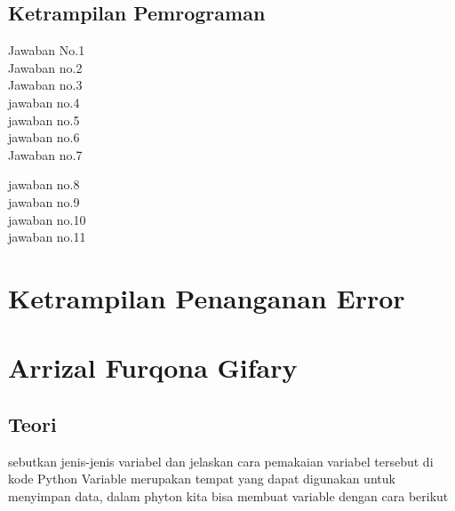 \begin{enumerate}
\begin{enumerate}
\section{Ketrampilan Pemrograman}
 Jawaban No.1\\

Jawaban no.2\\

Jawaban no.3\\

jawaban no.4\\

jawaban no.5\\

jawaban no.6\\

Jawaban no.7

jawaban no.8\\

jawaban no.9\\

jawaban no.10\\

jawaban no.11\\

\end{enumerate}
\section{Ketrampilan Penanganan Error}



\section{Arrizal Furqona Gifary}
\subsection{Teori}
\begin{enumarate}

\item sebutkan jenis-jenis variabel dan jelaskan cara pemakaian variabel tersebut di kode Python
Variable merupakan tempat yang dapat digunakan untuk menyimpan data, dalam phyton kita bisa membuat variable dengan cara berikut



\end{enumarate}
\end{enumerate}
